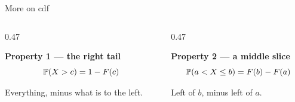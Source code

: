 \documentclass[9pt,english,aspectratio=169]{beamer}
\begin{document}
\begin{frame}{More on cdf}

  \begin{columns}[T]
    \begin{column}{0.47\textwidth}
      \begin{methodbox}
        \textbf{Property 1 --- the right tail}
        \[
          \mathbb{P}(X > c) = 1 - F(c)
        \]
        \vspace{-0.6em}

        {\small Everything, minus what is to the left.}
      \end{methodbox}
    \end{column}

    \begin{column}{0.47\textwidth}
      \begin{methodbox}
        \textbf{Property 2 --- a middle slice}
        \[
          \mathbb{P}(a < X \leq b) = F(b) - F(a)
        \]
        \vspace{-0.6em}

        {\small Left of $b$, minus left of $a$.}
      \end{methodbox}
    \end{column}
  \end{columns}
 
\end{frame}
\end{document}
